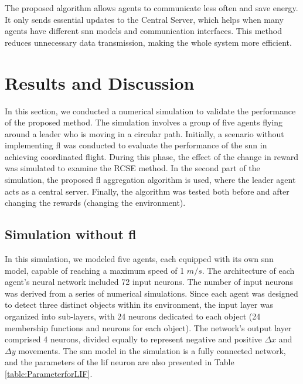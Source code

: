 The proposed algorithm allows agents to communicate less often and save energy. It only sends essential updates to the Central Server, which helps when many agents have different \ac{snn} models and communication interfaces. This method reduces unnecessary data transmission, making the whole system more efficient.

\section{Results and Discussion}

In this section, we conducted a numerical simulation to validate the performance of the proposed method. The simulation involves a group of five agents flying around a leader who is moving in a circular path. Initially, a scenario without implementing \ac{fl} was conducted to evaluate the performance of the \ac{snn} in achieving coordinated flight. During this phase, the effect of the change in reward was simulated to examine the \ac{RCSE} method. In the second part of the simulation, the proposed \ac{fl} aggregation algorithm is used, where the leader agent acts as a central server. Finally, the algorithm was tested both before and after changing the rewards (changing the environment).

\subsection{Simulation without \ac{fl}}

In this simulation, we modeled five agents, each equipped with its own \ac{snn} model, capable of reaching a maximum speed of 1 \(m/s\). The architecture of each agent's neural network included 72 input neurons. The number of input neurons was derived from a series of numerical simulations. Since each agent was designed to detect three distinct objects within its environment, the input layer was organized into sub-layers, with 24 neurons dedicated to each object (24 membership functions and neurons for each object). The network's output layer comprised 4 neurons, divided equally to represent negative and positive \(\Delta x\) and \(\Delta y\) movements. The \ac{snn} model in the simulation is a fully connected network, and the parameters of the \ac{lif} neuron are also presented in Table \ref{table:ParameterforLIF}.

